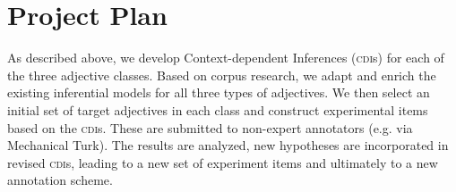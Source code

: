 \documentclass[10pt]{article}
\begin{document}


\vspace {-7mm}

\section{Project Plan}



\vspace {-3mm}

As described above, we develop Context-dependent Inferences (\textsc{cdi}s) for each of the three adjective classes. Based on corpus research, we adapt and enrich the existing inferential models for all three types of adjectives. We then select an initial set of target adjectives in each class and construct experimental items based on the \textsc{cdi}s. These are submitted to non-expert annotators (e.g. via Mechanical Turk). The results are analyzed, new hypotheses are incorporated in revised \textsc{cdi}s, leading to a new set of experiment items and ultimately to a new annotation scheme. 

\end{document}
